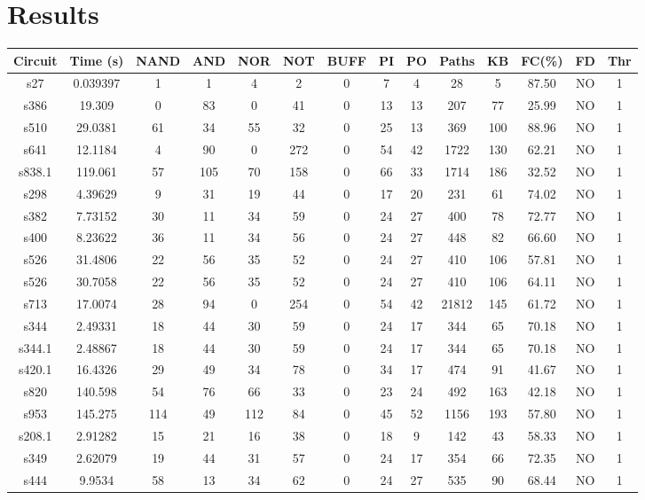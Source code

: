\documentclass[a4paper,11pt]{article}
\begin{document}
\clearpage 

\section*{Results}

\begin{center}
\begin{tabular}{||c c c c c c c c c c c c c c||}
\hline
Circuit & Time (s) & NAND & AND & NOR & NOT & BUFF & PI & PO & Paths & KB & FC(\%) & FD & Thr \\ [0.5ex] 
\hline\hline
 s27 & 0.039397 & 1  & 1  & 4  & 2  & 0  & 7  & 4  & 28  & 5  & 87.50 & NO  & 1 \\ 
\hline
 s386 & 19.309 & 0  & 83  & 0  & 41  & 0  & 13  & 13  & 207  & 77  & 25.99 & NO  & 1 \\ 
\hline
 s510 & 29.0381 & 61  & 34  & 55  & 32  & 0  & 25  & 13  & 369  & 100  & 88.96 & NO  & 1 \\ 
\hline
 s641 & 12.1184 & 4  & 90  & 0  & 272  & 0  & 54  & 42  & 1722  & 130  & 62.21 & NO  & 1 \\ 
\hline
 s838.1 & 119.061 & 57  & 105  & 70  & 158  & 0  & 66  & 33  & 1714  & 186  & 32.52 & NO  & 1 \\ 
\hline
 s298 & 4.39629 & 9  & 31  & 19  & 44  & 0  & 17  & 20  & 231  & 61  & 74.02 & NO  & 1 \\ 
\hline
 s382 & 7.73152 & 30  & 11  & 34  & 59  & 0  & 24  & 27  & 400  & 78  & 72.77 & NO  & 1 \\ 
\hline
 s400 & 8.23622 & 36  & 11  & 34  & 56  & 0  & 24  & 27  & 448  & 82  & 66.60 & NO  & 1 \\ 
\hline
 s526 & 31.4806 & 22  & 56  & 35  & 52  & 0  & 24  & 27  & 410  & 106  & 57.81 & NO  & 1 \\ 
\hline
 s526 & 30.7058 & 22  & 56  & 35  & 52  & 0  & 24  & 27  & 410  & 106  & 64.11 & NO  & 1 \\ 
\hline
 s713 & 17.0074 & 28  & 94  & 0  & 254  & 0  & 54  & 42  & 21812  & 145  & 61.72 & NO  & 1 \\ 
\hline
 s344 & 2.49331 & 18  & 44  & 30  & 59  & 0  & 24  & 17  & 344  & 65  & 70.18 & NO  & 1 \\ 
\hline
 s344.1 & 2.48867 & 18  & 44  & 30  & 59  & 0  & 24  & 17  & 344  & 65  & 70.18 & NO  & 1 \\ 
\hline
 s420.1 & 16.4326 & 29  & 49  & 34  & 78  & 0  & 34  & 17  & 474  & 91  & 41.67 & NO  & 1 \\ 
\hline
 s820 & 140.598 & 54  & 76  & 66  & 33  & 0  & 23  & 24  & 492  & 163  & 42.18 & NO  & 1 \\ 
\hline
 s953 & 145.275 & 114  & 49  & 112  & 84  & 0  & 45  & 52  & 1156  & 193  & 57.80 & NO  & 1 \\ 
\hline
 s208.1 & 2.91282 & 15  & 21  & 16  & 38  & 0  & 18  & 9  & 142  & 43  & 58.33 & NO  & 1 \\ 
\hline
 s349 & 2.62079 & 19  & 44  & 31  & 57  & 0  & 24  & 17  & 354  & 66  & 72.35 & NO  & 1 \\ 
\hline
 s444 & 9.9534 & 58  & 13  & 34  & 62  & 0  & 24  & 27  & 535  & 90  & 68.44 & NO  & 1 \\ 
\hline
\end{tabular}
\end{center}
\end{document}
